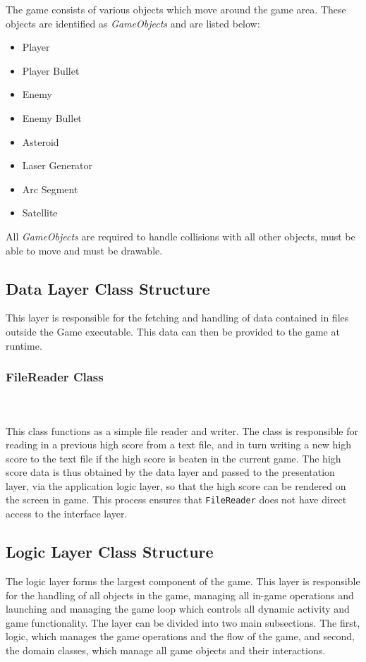 \documentclass[10pt,twocolumn]{witseiepaper}
\begin{document}
The game consists of various objects which move around the game area. These objects are identified as \textit{GameObjects} and are listed below:
\begin{itemize}
	\item Player
	\item Player Bullet
	\item Enemy
	\item Enemy Bullet
	\item Asteroid
	\item Laser Generator
	\item Arc Segment
	\item Satellite
\end{itemize}

All \textit{GameObjects} are required to handle collisions with all other objects, must be able to move and must be drawable. 

\subsection{Data Layer Class Structure}

This layer is responsible for the fetching and handling of data contained in files outside the Game executable. This data can then be provided to the game at runtime.

\subsubsection{FileReader Class}
~\\
~\\
This class functions as a simple file reader and writer. The class is responsible for reading in a previous high score from a text file, and in turn writing a new high score to the text file if the high score is beaten in the current game. The high score data is thus obtained by the data layer and passed to the presentation layer, via the application logic layer, so that the high score can be rendered on the screen in game. This process ensures that \texttt{FileReader} does not have direct access to the interface layer.

\subsection{Logic Layer Class Structure}

The logic layer forms the largest component of the game. This layer is responsible for the handling of all objects in the game, managing all in-game operations and launching and managing the game loop which controls all dynamic activity and game functionality. The layer can be divided into two main subsections. The first, logic, which manages the game operations and the flow of the game, and second, the domain classes, which manage all game objects and their interactions. 
\end{document}
